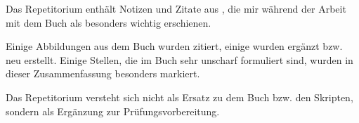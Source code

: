 \Hinweise

Das Repetitorium enthält Notizen und Zitate aus \cite[]{Oec22}, die mir während der Arbeit mit dem Buch als besonders wichtig erschienen.

Einige Abbildungen aus dem Buch wurden zitiert, einige wurden ergänzt bzw. neu erstellt.
Einige Stellen, die im Buch sehr unscharf formuliert sind, wurden in dieser Zusammenfassung besonders markiert.

Das Repetitorium versteht sich nicht als Ersatz zu dem Buch bzw. den Skripten, sondern als Ergänzung zur Prüfungsvorbereitung.